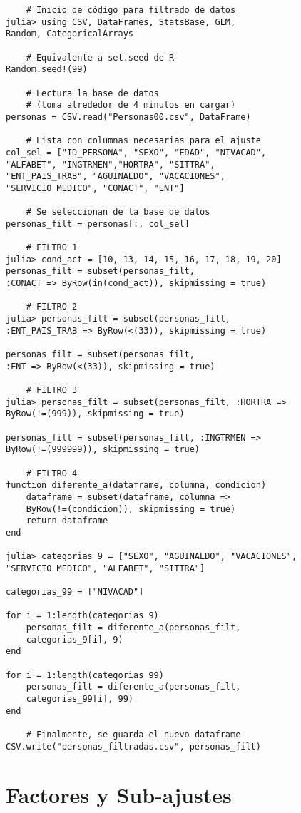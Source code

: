 \begin{verbatim}
	# Inicio de código para filtrado de datos
julia> using CSV, DataFrames, StatsBase, GLM, 
Random, CategoricalArrays

	# Equivalente a set.seed de R
Random.seed!(99)

	# Lectura la base de datos 
	# (toma alrededor de 4 minutos en cargar)
personas = CSV.read("Personas00.csv", DataFrame)

	# Lista con columnas necesarias para el ajuste
col_sel = ["ID_PERSONA", "SEXO", "EDAD", "NIVACAD", 
"ALFABET", "INGTRMEN","HORTRA", "SITTRA", 
"ENT_PAIS_TRAB", "AGUINALDO", "VACACIONES", 
"SERVICIO_MEDICO", "CONACT", "ENT"]
         
	# Se seleccionan de la base de datos 
personas_filt = personas[:, col_sel]    

	# FILTRO 1
julia> cond_act = [10, 13, 14, 15, 16, 17, 18, 19, 20]
personas_filt = subset(personas_filt, 
:CONACT => ByRow(in(cond_act)), skipmissing = true)

	# FILTRO 2
julia> personas_filt = subset(personas_filt, 
:ENT_PAIS_TRAB => ByRow(<(33)), skipmissing = true)

personas_filt = subset(personas_filt, 
:ENT => ByRow(<(33)), skipmissing = true)

	# FILTRO 3
julia> personas_filt = subset(personas_filt, :HORTRA => 
ByRow(!=(999)), skipmissing = true)

personas_filt = subset(personas_filt, :INGTRMEN => 
ByRow(!=(999999)), skipmissing = true)

	# FILTRO 4
function diferente_a(dataframe, columna, condicion)
	dataframe = subset(dataframe, columna => 
	ByRow(!=(condicion)), skipmissing = true)  
    return dataframe
end

julia> categorias_9 = ["SEXO", "AGUINALDO", "VACACIONES",
"SERVICIO_MEDICO", "ALFABET", "SITTRA"]

categorias_99 = ["NIVACAD"]

for i = 1:length(categorias_9)
    personas_filt = diferente_a(personas_filt, 
    categorias_9[i], 9)
end

for i = 1:length(categorias_99)
    personas_filt = diferente_a(personas_filt, 
    categorias_99[i], 99)
end

	# Finalmente, se guarda el nuevo dataframe
CSV.write("personas_filtradas.csv", personas_filt)
\end{verbatim}


\section{Factores y Sub-ajustes} \label{reg_categorias}

